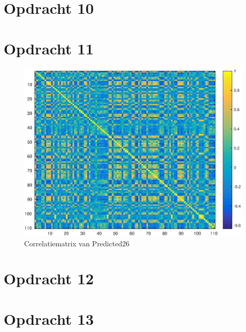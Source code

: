 \documentclass[11pt,a4paper]{article}
\begin{document}


\section*{Opdracht 10}



\section*{Opdracht 11}

\begin{figure}[H]
\centering
\includegraphics[scale=0.55]{opdracht11}
\caption{Correlatiematrix van Predicted26}
\end{figure}



\section*{Opdracht 12}



\section*{Opdracht 13}
\end{document}
